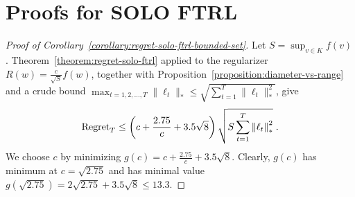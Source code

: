 \section{Proofs for SOLO FTRL}
\label{section:solo-ftrl-proof}

\begin{proof}[Proof of Corollary~\ref{corollary:regret-solo-ftrl-bounded-set}]
Let $S = \sup_{v \in K} f(v)$. Theorem~\ref{theorem:regret-solo-ftrl} applied
to the regularizer $R(w) = \frac{c}{\sqrt{S}} f(w)$, together with
Proposition~\ref{proposition:diameter-vs-range} and a crude bound
$\max_{t=1,2,\dots,T} \|\ell_t\|_* \le \sqrt{\sum_{t=1}^T \|\ell_t\|_*^2}$,
give
$$
\operatorname{Regret}_T \le \left(c + \frac{2.75}{c}  + 3.5\sqrt{8} \right) \sqrt{S \sum_{t=1}^{T} {\left\|{\ell_t}\right\|}_*^2} \; .
$$
We choose $c$ by minimizing $g(c) = c + \frac{2.75}{c} + 3.5\sqrt{8}$. Clearly,
$g(c)$ has minimum at $c = \sqrt{2.75}$ and has minimal value $g(\sqrt{2.75}) =
2\sqrt{2.75} + 3.5\sqrt{8} \le 13.3$.
\end{proof}
